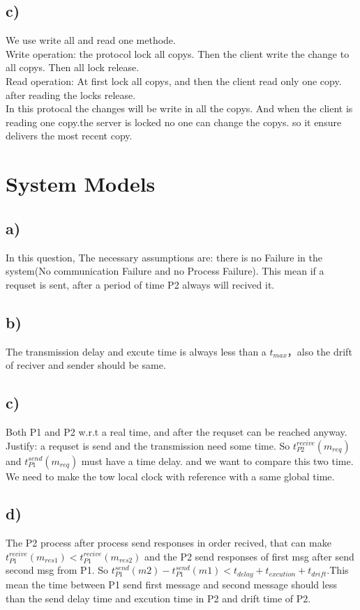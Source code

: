 \documentclass{article}
\begin{document}
\subsection*{c)}
We use write all and read one methode. 
\\Write operation: the protocol lock all copys. Then the client write the change to all copys. Then all lock release.
\\Read operation: At first lock all copys, and then the client read only one copy. after reading the locks release.
\\In this protocal the changes will be write in all the copys. And when the client is reading one copy.the server is locked no one can change the copys. so
it ensure delivers the most recent copy.
\section*{System Models}
\subsection*{a)}
In this question, The necessary assumptions are:  there is no Failure in the system(No communication Failure and no Process Failure). This mean if a requset is sent, after a period of time P2 always will recived it.
\subsection*{b)}
The transmission delay and excute time is always less than a $t_{max}$，also the drift of reciver and sender should be same.
\subsection*{c)}
Both P1 and P2 w.r.t a real time, and after the requset can be reached anyway. Justify: a requset is send and the transmission need some time. So $t_{P2}^{recive}(m_{req})$ and $t_{P1}^{send}(m_{req})$ must have a time delay. and we want to compare this two time. We need to make the tow local clock with reference with a same global time.
\subsection*{d)}
The P2 process  after process send responses in order recived, that can make $t_{P1}^{recive}(m_{res1})<t_{P1}^{recive}(m_{res2})$
and the P2 send responses of first msg after send second msg from P1. So $t_{P1}^{send}(m2)-t_{P1}^{send}(m1)<t_{delay}+t_{excution}+t_{drift}$.This mean the time between P1 send first message and second message should less than the send delay time and excution time in P2 and drift time of P2.
\end{document}

